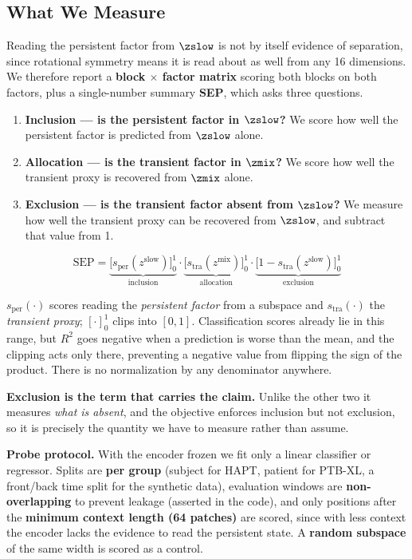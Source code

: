 \subsection{What We Measure}

Reading the persistent factor from $\zslow$ is not by itself evidence of separation, since rotational symmetry means it is read about as well from any 16 dimensions. We therefore report a \textbf{block $\times$ factor matrix} scoring both blocks on both factors, plus a single-number summary \textbf{SEP}, which asks three questions.

\begin{enumerate}
\item \textbf{Inclusion --- is the persistent factor in $\zslow$?} We score how well the persistent factor is predicted from $\zslow$ alone.
\item \textbf{Allocation --- is the transient factor in $\zmix$?} We score how well the transient proxy is recovered from $\zmix$ alone.
\item \textbf{Exclusion --- is the transient factor absent from $\zslow$?} We measure how well the transient proxy can be recovered from $\zslow$, and subtract that value from 1.
\end{enumerate}

\begin{equation}
\mathrm{SEP} = \underbrace{\big[s_{\text{per}}(z^{\mathrm{slow}})\big]_0^1}_{\text{inclusion}} \cdot \underbrace{\big[s_{\text{tra}}(z^{\mathrm{mix}})\big]_0^1}_{\text{allocation}} \cdot \underbrace{\big[1-s_{\text{tra}}(z^{\mathrm{slow}})\big]_0^1}_{\text{exclusion}}
\label{eq:sep}
\end{equation}

$s_{\text{per}}(\cdot)$ scores reading the \emph{persistent factor} from a subspace and $s_{\text{tra}}(\cdot)$ the \emph{transient proxy}; $[\cdot]_0^1$ clips into $[0,1]$. Classification scores already lie in this range, but $R^2$ goes negative when a prediction is worse than the mean, and the clipping acts only there, preventing a negative value from flipping the sign of the product. There is no normalization by any denominator anywhere.


\textbf{Exclusion is the term that carries the claim.} Unlike the other two it measures \emph{what is absent}, and the objective enforces inclusion but not exclusion, so it is precisely the quantity we have to measure rather than assume.


\textbf{Probe protocol.} With the encoder frozen we fit only a linear classifier or regressor. Splits are \textbf{per group} (subject for HAPT, patient for PTB-XL, a front/back time split for the synthetic data), evaluation windows are \textbf{non-overlapping} to prevent leakage (asserted in the code), and only positions after the \textbf{minimum context length (64 patches)} are scored, since with less context the encoder lacks the evidence to read the persistent state. A \textbf{random subspace} of the same width is scored as a control.

